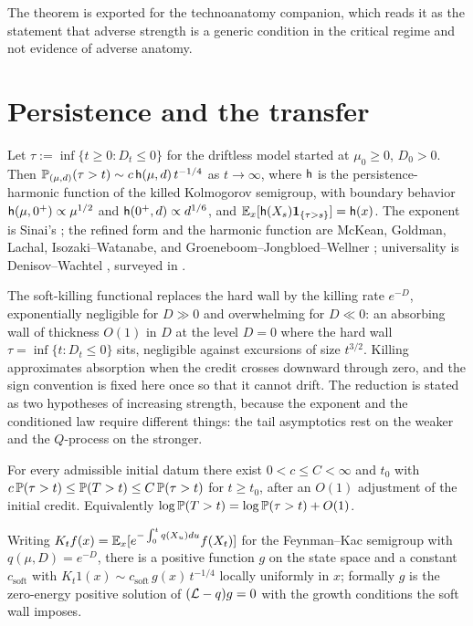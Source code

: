 \noindent The theorem is exported for the technoanatomy companion, which
reads it as the statement that adverse strength is a generic condition
in the critical regime and not evidence of adverse anatomy.

\section{Persistence and the transfer}\label{sec:persist}

\begin{theorem}
\label{thm:persist}
Let $\tau:=\inf\{t\ge0:D_t\le0\}$ for the driftless model started at
$\mu_0\ge0$, $D_0>0$. Then
$\mathbb{P}_{(\mu,d)}(\tau>t)\sim c\,\mathsf{h}(\mu,d)\,t^{-1/4}$ as $t\to\infty$,
where $\mathsf{h}$ is the persistence-harmonic function of the killed
Kolmogorov semigroup, with boundary behavior
$\mathsf{h}(\mu,0^+)\propto\mu^{1/2}$ and $\mathsf{h}(0^+,d)\propto d^{1/6}$, and
$\mathbb{E}_x[\mathsf{h}(X_s)\mathbf{1}_{\{\tau>s\}}]=\mathsf{h}(x)$. The exponent is Sinai's
\cite{Sin92}; the refined form and the harmonic function are
McKean, Goldman, Lachal, Isozaki--Watanabe, and
Groeneboom--Jongbloed--Wellner
\cite{McK63,Gol71,Lac91,IW94,GJW99}; universality is
Denisov--Wachtel \cite{DW15}, surveyed in \cite{AS15,BMS13}.
\end{theorem}

The soft-killing functional replaces the hard wall by the killing rate
$e^{-D}$, exponentially negligible for $D\gg0$ and overwhelming for
$D\ll0$: an absorbing wall of thickness $O(1)$ in $D$ at the level
$D=0$ where the hard wall $\tau=\inf\{t:D_t\le0\}$ sits, negligible
against excursions of size $t^{3/2}$. Killing approximates absorption
when the credit crosses downward through zero, and the sign convention
is fixed here once so that it cannot drift. The reduction is stated as two hypotheses of increasing strength,
because the exponent and the conditioned law require different
things: the tail asymptotics rest on the weaker and the $Q$-process
on the stronger.

\begin{ansatz}\label{ans:soft}
For every admissible initial datum there exist
$0<c\le C<\infty$ and $t_0$ with
$c\,\mathbb{P}(\tau>t)\le\mathbb{P}(T>t)\le C\,\mathbb{P}(\tau>t)$ for $t\ge t_0$, after an
$O(1)$ adjustment of the initial credit. Equivalently
$\log\mathbb{P}(T>t)=\log\mathbb{P}(\tau>t)+O(1)$.
\end{ansatz}

\begin{ansatz}\label{ans:ratio}
Writing $K_tf(x)=\mathbb{E}_x[e^{-\int_0^tq(X_u)du}f(X_t)]$ for the
Feynman--Kac semigroup with $q(\mu,D)=e^{-D}$, there is a positive
function $g$ on the state space and a constant $c_{\mathrm{soft}}$ with
$K_t1(x)\sim c_{\mathrm{soft}}\,g(x)\,t^{-1/4}$ locally uniformly in
$x$; formally $g$ is the zero-energy positive solution of
$(\mathcal{L}-q)g=0$ with the growth conditions the soft wall imposes.
\end{ansatz}

